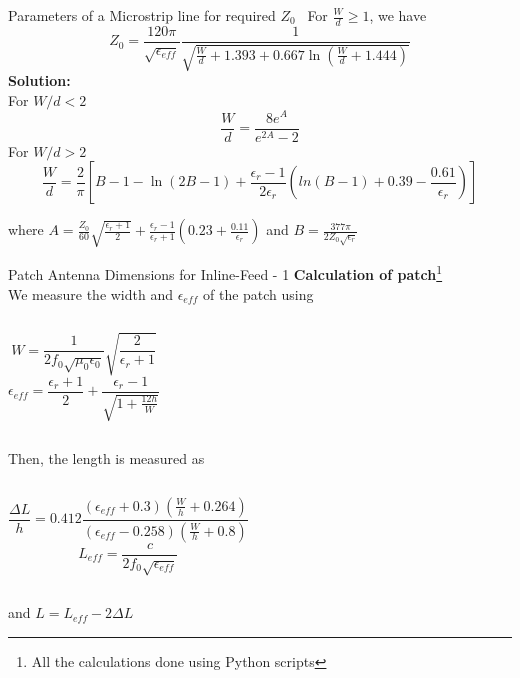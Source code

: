 \documentclass{beamer}
\begin{document}

\begin{frame}{Parameters of a Microstrip line for required \(Z_0\)~\cite{Pozar:882338}}
    For \(\frac{W}{d}\ge1\), we have
    \[
    Z_0=\frac{120\pi}{\sqrt{\epsilon_{eff}}}\frac{1}{\displaystyle\sqrt{\frac{W}{d} + 1.393 + 0.667\ln\left(\frac{W}{d}+1.444\right)}}
    \]
    \textbf{Solution:}\\
    For \(W/d< 2\)
    \[
    \frac{W}{d} = \frac{8e^A}{e^{2A}-2}
    \]
    For \(W/d> 2\)
    \[
    \frac{W}{d} = \frac{2}{\pi}\left[B-1-\ln(2B-1)+\frac{\epsilon_r-1}{2\epsilon_r}\left(ln(B-1)+0.39-\frac{0.61}{\epsilon_r} \right)\right]
    \]
    
    where \(\displaystyle A=\frac{Z_0}{60}\sqrt{\frac{\epsilon_r+1}{2}}+\frac{\epsilon_r-1}{\epsilon_r+1}\left(0.23+\frac{0.11}{\epsilon_r}\right)\) and \(\displaystyle B = \frac{377\pi}{2Z_0\sqrt{\epsilon_r}}\)

\end{frame}

\begin{frame}{Patch Antenna Dimensions for Inline-Feed - 1}
\textbf{Calculation of patch}\footnote{All the calculations done using Python scripts}\\
We measure the width and \(\epsilon_{eff}\) of the patch using
\begin{columns}
    \[\displaystyle W=\frac{1}{2f_0\sqrt{\mu_0\epsilon_0}}\sqrt{\frac{2}{\epsilon_r+1}}\]
    \[\displaystyle \epsilon_{eff} = \frac{\epsilon_r+1}{2} + \frac{\epsilon_r-1}{\sqrt{1+\frac{12h}{W}}} \]
\end{columns}

Then, the length is measured as
\begin{columns}
    \[\displaystyle\frac{\Delta L}{h} = 0.412\frac{(\epsilon_{eff} + 0.3)\left(\frac{W}{h} + 0.264\right)}{(\epsilon_{eff} - 0.258)\left(\frac{W}{h} + 0.8\right)}\]
    \[\displaystyle L_{eff} = \frac{c}{2f_0\sqrt{\epsilon_{eff}}}\]
\end{columns}
and \(L = L_{eff} -2\Delta L \)


\end{frame}
\end{document}
